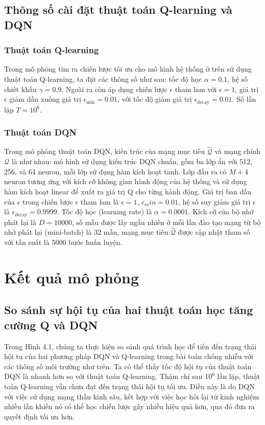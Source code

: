 \documentclass{uetgraduation}
\begin{document}
\subsection{Thông số cài đặt thuật toán Q-learning và DQN}
\subsubsection{Thuật toán Q-learning}
Trong mô phỏng tìm ra chiến lược tối ưu cho mô hình hệ thống ở trên sử dụng thuật toán Q-learning, ta đặt các thông số như sau: tốc độ học $\alpha = 0.1$,
hệ số chiết khấu $\gamma = 0.9$. Ngoài ra còn áp dụng chiến lược $\epsilon$ tham lam với $\epsilon = 1$, giá trị $\epsilon$ giảm dần xuống giá trị $\epsilon_\text{min} = 0.01$,
với tốc độ giảm giá trị $\epsilon_\text{decay} = 0.01$. Số lần lặp $T = 10^6$.

\subsubsection{Thuật toán DQN}
Trong mô phỏng thuật toán DQN, kiến trúc của mạng mục tiêu $\hat{\mathcal{Q}}$ và mạng chính $\mathcal{Q}$ là như nhau: mô hình sử dụng kiến trúc DQN chuẩn, 
gồm ba lớp ẩn với 512, 256, và 64 neuron, mỗi lớp sử dụng hàm kích hoạt tanh. Lớp đầu ra có $M+4$ neuron tương ứng với kích cỡ không gian hành động của hệ thống 
và sử dụng hàm kích hoạt linear để xuất ra giá trị Q cho từng hành động. Giá trị ban đầu của $\epsilon$ trong chiến lược $\epsilon$ tham lam là $\epsilon = 1$,
$\epsilon_min = 0.01$, hệ số suy giảm giá trị $\epsilon$ là $\epsilon_\text{decay} = 0.9999$. Tốc độ học (learning rate) là $\alpha = 0.0001$. Kích cỡ của bộ
nhớ phát lại là $D = 10000$, số mẫu được lấy ngẫu nhiên ở mỗi lần đào tạo mạng từ bộ nhớ phát lại (mini-batch) là 32 mẫu, mạng mục tiêu $\hat{\mathcal{Q}}$ được cập
nhật tham số với tần suất là 5000 bước huấn luyện.

\section{Kết quả mô phỏng}
\subsection{So sánh sự hội tụ của hai thuật toán học tăng cường Q và DQN}
Trong Hình 4.1, chúng ta thực hiện so sánh quá trình học để tiến đến trạng thái hội tụ của hai phương pháp DQN và Q-learning trong bài toán
chống nhiễu với các thông số môi trường như trên. Ta có thể thấy tốc độ hội tụ của thuật toán DQN là nhanh hơn so với thuật toán Q-learning.
Thậm chí sau $10^6$ lần lặp, thuật toán Q-learning vẫn chưa đạt đến trạng thái hội tụ tối ưu. Điều này là do DQN với việc sử dụng mạng thần
kinh sâu, kết hợp với việc học hỏi lại từ kinh nghiệm nhiều lần khiến nó có thể học chiến lược gây nhiễu hiệu quả hơn, qua đó đưa ra quyết định
tối ưu hơn.
\end{document}
